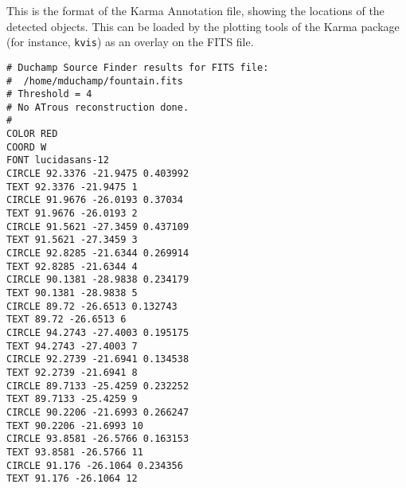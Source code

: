 %
%
%
%
\label{app-karma}

This is the format of the Karma Annotation file, showing the locations
of the detected objects. This can be loaded by the plotting tools of
the Karma package (for instance, \texttt{kvis}) as an overlay on the FITS
file.

\begin{verbatim}
# Duchamp Source Finder results for FITS file:
#  /home/mduchamp/fountain.fits
# Threshold = 4
# No ATrous reconstruction done.
#
COLOR RED
COORD W
FONT lucidasans-12
CIRCLE 92.3376 -21.9475 0.403992
TEXT 92.3376 -21.9475 1
CIRCLE 91.9676 -26.0193 0.37034
TEXT 91.9676 -26.0193 2
CIRCLE 91.5621 -27.3459 0.437109
TEXT 91.5621 -27.3459 3
CIRCLE 92.8285 -21.6344 0.269914
TEXT 92.8285 -21.6344 4
CIRCLE 90.1381 -28.9838 0.234179
TEXT 90.1381 -28.9838 5
CIRCLE 89.72 -26.6513 0.132743
TEXT 89.72 -26.6513 6
CIRCLE 94.2743 -27.4003 0.195175
TEXT 94.2743 -27.4003 7
CIRCLE 92.2739 -21.6941 0.134538
TEXT 92.2739 -21.6941 8
CIRCLE 89.7133 -25.4259 0.232252
TEXT 89.7133 -25.4259 9
CIRCLE 90.2206 -21.6993 0.266247
TEXT 90.2206 -21.6993 10
CIRCLE 93.8581 -26.5766 0.163153
TEXT 93.8581 -26.5766 11
CIRCLE 91.176 -26.1064 0.234356
TEXT 91.176 -26.1064 12
\end{verbatim}
